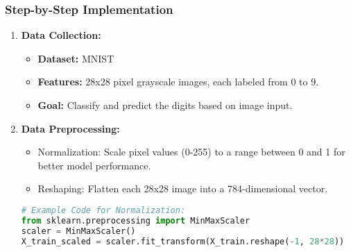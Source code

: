 \documentclass[aspectratio=169]{beamer}
\begin{document}
\begin{frame}[fragile]
    \frametitle{Step-by-Step Implementation}
    \begin{enumerate}
        \item \textbf{Data Collection:}
            \begin{itemize}
                \item \textbf{Dataset:} MNIST
                \item \textbf{Features:} 28x28 pixel grayscale images, each labeled from 0 to 9.
                \item \textbf{Goal:} Classify and predict the digits based on image input.
            \end{itemize}
            
        \item \textbf{Data Preprocessing:}
            \begin{itemize}
                \item Normalization: Scale pixel values (0-255) to a range between 0 and 1 for better model performance.
                \item Reshaping: Flatten each 28x28 image into a 784-dimensional vector.
            \end{itemize}
            \begin{lstlisting}[language=Python]
# Example Code for Normalization:
from sklearn.preprocessing import MinMaxScaler
scaler = MinMaxScaler()
X_train_scaled = scaler.fit_transform(X_train.reshape(-1, 28*28))
            \end{lstlisting}
    \end{enumerate}
\end{frame}
\end{document}
